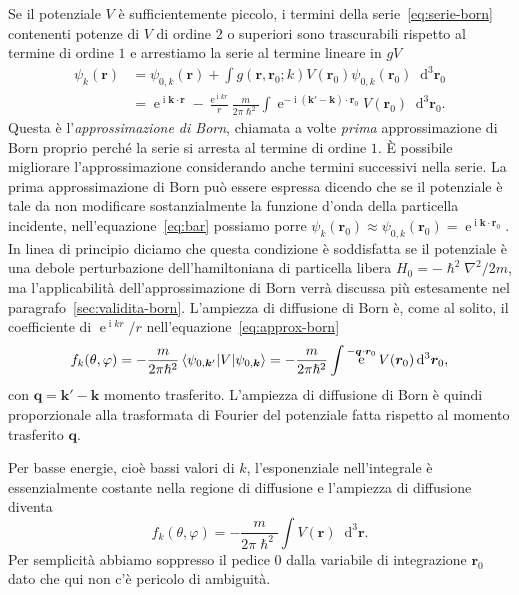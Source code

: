 \documentclass[a4paper,fleqn,twoside,12pt]{article}
\renewcommand{\phi}{\varphi}
\newcommand*{\dd}{\mathop{}\!\mathrm{d}} %
\DeclareMathOperator{\e}{\mathrm{e}} %
\DeclareMathOperator{\uimm}{\mathrm{i}} %
\begin{document}
Se il potenziale $V$ è sufficientemente piccolo, i termini della
serie~\eqref{eq:serie-born} contenenti potenze di $V$ di ordine $2$ o superiori
sono trascurabili rispetto al termine di ordine $1$ e arrestiamo la serie al
termine lineare in $gV$
\begin{equation}
  \label{eq:approx-born}
  \begin{split}
    \psi_{k}(\bm{r}) &= \psi_{0,k}(\bm{r}) + \int g(\bm{r},\bm{r}_{0};k)
    V(\bm{r}_{0}) \psi_{0,k}(\bm{r}_{0}) \dd^{3}\bm{r}_{0} \\
    &= \e^{\uimm \bm{k}\cdot\bm{r}} - \frac{\e^{\uimm kr}}{r}
    \frac{m}{2\pi\hslash^{2}}\int \e^{-\uimm (\bm{k}' - \bm{k})\cdot\bm{r}_{0}}
    V(\bm{r}_{0}) \dd^{3} \bm{r}_{0}.
  \end{split}
\end{equation}
Questa è l'\emph{approssimazione di Born}, chiamata a volte \emph{prima}
approssimazione di Born proprio perché la serie si arresta al termine di ordine
$1$.  È possibile migliorare l'approssimazione considerando anche termini
successivi nella serie.  La prima approssimazione di Born può essere espressa
dicendo che se il potenziale è tale da non modificare sostanzialmente la
funzione d'onda della particella incidente, nell'equazione~\eqref{eq:bar}
possiamo porre
$\psi_{k}(\bm{r}_{0}) \approx \psi_{0,k}(\bm{r}_{0}) =
\e^{\uimm \bm{k}\cdot\bm{r}_{0}}$.
In linea di principio diciamo che questa condizione è soddisfatta se il
potenziale è una debole perturbazione dell'hamiltoniana di particella libera
$H_{0} = -\hslash^{2}\nabla^{2}/2m$, ma l'applicabilità dell'approssimazione di
Born verrà discussa più estesamente nel paragrafo~\ref{sec:validita-born}.
L'ampiezza di diffusione di Born è, come al solito, il coefficiente di
$\e^{\uimm kr}/r$ nell'equazione~\eqref{eq:approx-born}
\begin{equation}
  \label{eq:ampiezza-born-braket}
  f_{k}(\theta,\phi) = -\frac{m}{2\pi\hslash^{2}} \braket{\psi_{0,\bm{k}'} | V |
    \psi_{0,\bm{k}}} = -\frac{m}{2\pi\hslash^{2}} \int \e^{-\bm{q}\cdot\bm{r}_{0}}
  V(\bm{r}_{0}) \dd^{3} \bm{r}_{0},
\end{equation}
con $\bm{q} = \bm{k}' - \bm{k}$ momento trasferito.  L'ampiezza di diffusione di
Born è quindi proporzionale alla trasformata di Fourier del potenziale fatta
rispetto al momento trasferito $\bm{q}$.

Per basse energie, cioè bassi valori di $k$, l'esponenziale nell'integrale è
essenzialmente costante nella regione di diffusione e l'ampiezza di diffusione
diventa
\begin{equation}
  \label{eq:ampiezza-born-basse}
  f_{k}(\theta,\phi) = -\frac{m}{2\pi\hslash^{2}} \int V(\bm{r}) \dd^{3}
  \bm{r}.
\end{equation}
Per semplicità abbiamo soppresso il pedice $0$ dalla variabile di integrazione
$\bm{r}_{0}$ dato che qui non c'è pericolo di ambiguità.
\end{document}
